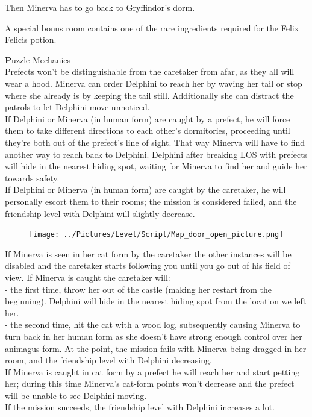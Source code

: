 Then Minerva has to go back to Gryffindor's dorm.

A special bonus room contains one of the rare ingredients required for the Felix Felicis potion.

\textbf Puzzle Mechanics \\

Prefects won't be distinguishable from the caretaker from afar, as they all will wear a hood. Minerva can order Delphini to reach her by waving her tail or stop where she already is by keeping the tail still. Additionally she can distract the patrols to let Delphini move unnoticed. \\

If Delphini or Minerva (in human form) are caught by a prefect, he will force them to take different directions to each other's dormitories, proceeding until they're both out of the prefect's line of sight. That way Minerva will have to find another way to reach back to Delphini. Delphini after breaking LOS with prefects will hide in the nearest hiding spot, waiting for Minerva to find her and guide her towards safety.\\

If Delphini or Minerva (in human form) are caught by the caretaker, he will personally escort them to their rooms; the mission is considered failed, and the friendship level with Delphini will slightly decrease.\\

\begin{figure}[H]
\texttt{[image: ../Pictures/Level/Script/Map\_door\_open\_picture.png]}
\end{figure}

If Minerva is seen in her cat form by the caretaker the other instances will be disabled and the caretaker starts following you until you go out of his field of view.
If Minerva is caught the caretaker will: \\

- the first time, throw her out of the castle (making her restart from the beginning). Delphini will hide in the nearest hiding spot from the location we left her.\\
- the second time, hit the cat with a wood log, subsequently causing Minerva to turn back in her human form as she doesn't have strong enough control over her animagus form. At the point, the mission fails with Minerva being dragged in her room, and the friendship level with Delphini decreasing.\\

If Minerva is caught in cat form by a prefect he will reach her and start petting her; during this time Minerva's cat-form points won't decrease and the prefect will be unable to see Delphini moving.\\

If the mission succeeds, the friendship level with Delphini increases a lot.
\pagebreak


